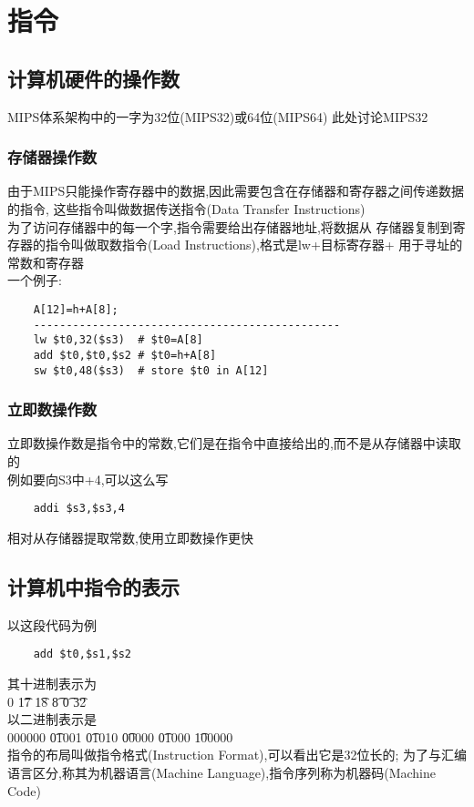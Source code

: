 \documentclass{ctexart}
\begin{document}
\section{指令}
\subsection{计算机硬件的操作数}
MIPS体系架构中的一字为32位(MIPS32)或64位(MIPS64) 此处讨论MIPS32\\
\subsubsection{存储器操作数}
由于MIPS只能操作寄存器中的数据,因此需要包含在存储器和寄存器之间传递数据的指令,
这些指令叫做数据传送指令(Data Transfer Instructions)\\
为了访问存储器中的每一个字,指令需要给出存储器地址,将数据从
存储器复制到寄存器的指令叫做取数指令(Load Instructions),格式是lw+目标寄存器+
用于寻址的常数和寄存器\\
一个例子:\\
\begin{lstlisting}
    A[12]=h+A[8];
    -----------------------------------------------
    lw $t0,32($s3)  # $t0=A[8]
    add $t0,$t0,$s2 # $t0=h+A[8]
    sw $t0,48($s3)  # store $t0 in A[12]
\end{lstlisting}
\subsubsection{立即数操作数}
立即数操作数是指令中的常数,它们是在指令中直接给出的,而不是从存储器中读取的\\
例如要向S3中+4,可以这么写
\begin{lstlisting}
    addi $s3,$s3,4
\end{lstlisting}
相对从存储器提取常数,使用立即数操作更快\\
\subsection{计算机中指令的表示}
以这段代码为例
\begin{lstlisting}
    add $t0,$s1,$s2
\end{lstlisting}
其十进制表示为\\
0 \t 17 \t 18 \t 8 \t 0 \t 32 \\
以二进制表示是\\
000000 \t 01001 \t 01010 \t 00000 \t 01000 \t 100000 \\
指令的布局叫做指令格式(Instruction Format),可以看出它是32位长的;
为了与汇编语言区分,称其为机器语言(Machine Language),指令序列称为机器码(Machine Code)\\
\end{document}
